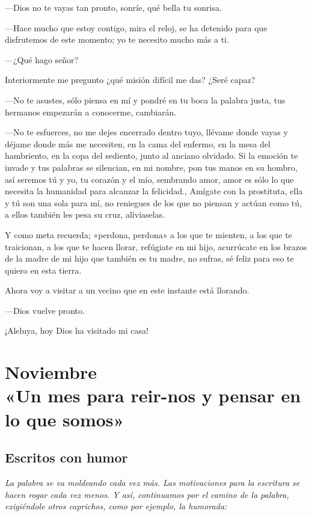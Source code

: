 \documentclass[11pt,twoside,openright,a5paper]{book}
\begin{document}
---Dios no te vayas tan pronto, sonríe, qué bella tu sonrisa.

---Hace mucho que estoy contigo, mira el reloj, se ha detenido para que disfrutemos de este momento; yo te necesito mucho más a ti.

---¿Qué hago señor?

Interiormente me pregunto ¿qué misión difícil me das? ¿Seré capaz?

---No te asustes, sólo piensa en mí y pondré en tu boca la palabra justa, tus hermanos empezarán a conocerme, cambiarán.

---No te esfuerces, no me dejes encerrado dentro tuyo, llévame donde vayas y déjame donde más me necesiten, en la cama del enfermo, en la mesa del hambriento, en la copa del sediento, junto al anciano olvidado. Si la emoción te invade y tus palabras se silencian, en mi nombre, pon  tus manos en su hombro, así seremos tú y yo, tu corazón y el mío, sembrando amor, amor es sólo lo que necesita la humanidad para alcanzar la felicidad., Amígate con la prostituta, ella y tú son una sola para mí, no reniegues de los que no piensan y actúan como tú, a ellos también les pesa su cruz, alíviaselas.

Y como meta recuerda; «perdona, perdona» a los  que te mienten, a los que te traicionan, a los que te hacen llorar, refúgiate en mi hijo, acurrúcate en los brazos de la madre de mi hijo que también es tu madre, no sufras, sé feliz para eso te quiero en esta tierra.

Ahora voy a visitar a un vecino que en este instante está llorando.

---Dios vuelve pronto.

¡Aleluya, hoy Dios ha visitado mi casa!

\part*{Noviembre\\«Un mes para reir-nos y pensar en lo que somos»}

\chapter*{Escritos con humor}

\vspace{0.5cm}
\emph{La palabra se va moldeando cada vez más. Las motivaciones para la escritura se hacen rogar cada vez menos. Y así, continuamos por el camino de la palabra, exigiéndole otros caprichos, como por ejemplo, la humorada:}
\end{document}
